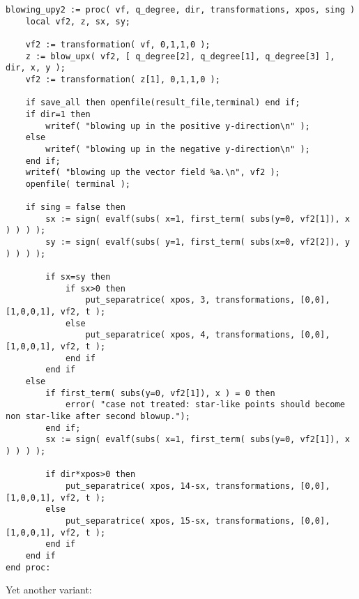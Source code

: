 \documentclass[a4paper,10pt]{article}
\begin{document}
\begin{lstlisting}[name=blowup]
blowing_upy2 := proc( vf, q_degree, dir, transformations, xpos, sing )
    local vf2, z, sx, sy;

    vf2 := transformation( vf, 0,1,1,0 );
    z := blow_upx( vf2, [ q_degree[2], q_degree[1], q_degree[3] ], dir, x, y );
    vf2 := transformation( z[1], 0,1,1,0 );

    if save_all then openfile(result_file,terminal) end if;
    if dir=1 then
        writef( "blowing up in the positive y-direction\n" );
    else
        writef( "blowing up in the negative y-direction\n" );
    end if;
    writef( "blowing up the vector field %a.\n", vf2 );
    openfile( terminal );

    if sing = false then
        sx := sign( evalf(subs( x=1, first_term( subs(y=0, vf2[1]), x ) ) ) );
        sy := sign( evalf(subs( y=1, first_term( subs(x=0, vf2[2]), y ) ) ) );

        if sx=sy then
            if sx>0 then
                put_separatrice( xpos, 3, transformations, [0,0], [1,0,0,1], vf2, t );
            else
                put_separatrice( xpos, 4, transformations, [0,0], [1,0,0,1], vf2, t );
            end if
        end if
    else
        if first_term( subs(y=0, vf2[1]), x ) = 0 then
            error( "case not treated: star-like points should become non star-like after second blowup.");
        end if;
        sx := sign( evalf(subs( x=1, first_term( subs(y=0, vf2[1]), x ) ) ) );

        if dir*xpos>0 then
            put_separatrice( xpos, 14-sx, transformations, [0,0], [1,0,0,1], vf2, t );
        else
            put_separatrice( xpos, 15-sx, transformations, [0,0], [1,0,0,1], vf2, t );
        end if
    end if
end proc:
\end{lstlisting}

Yet another variant:
\end{document}
